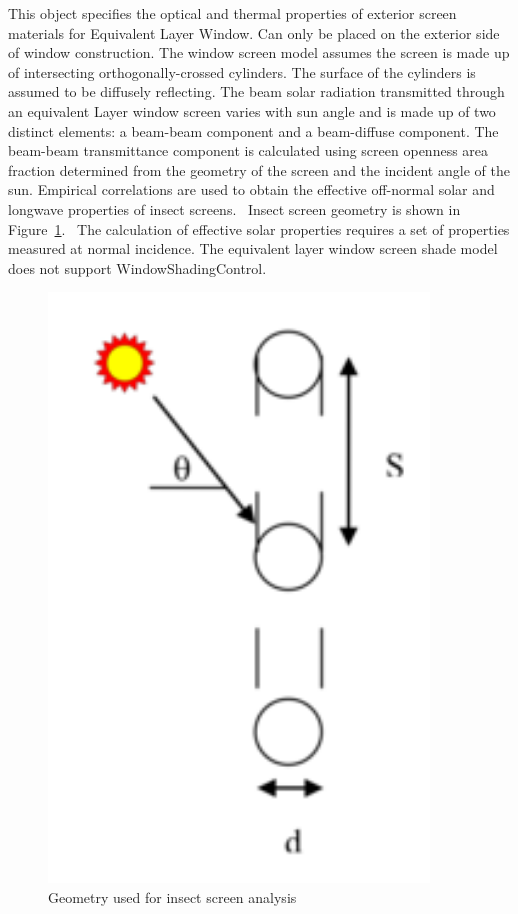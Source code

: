 This object specifies the optical and thermal properties of exterior screen materials for Equivalent Layer Window. Can only be placed on the exterior side of window construction. The window screen model assumes the screen is made up of intersecting orthogonally-crossed cylinders. The surface of the cylinders is assumed to be diffusely reflecting. The beam solar radiation transmitted through an equivalent Layer window screen varies with sun angle and is made up of two distinct elements: a beam-beam component and a beam-diffuse component. The beam-beam transmittance component is calculated using screen openness area fraction determined from the geometry of the screen and the incident angle of the sun. Empirical correlations are used to obtain the effective off-normal solar and longwave properties of insect screens.~ Insect screen geometry is shown in Figure~\ref{fig:geometry-used-for-insect-screen-analysis}.~ The calculation of effective solar properties requires a set of properties measured at normal incidence. The equivalent layer window screen shade model does not support WindowShadingControl.

\begin{figure}[hbtp] %
\centering
\includegraphics[width=0.9\textwidth, height=0.9\textheight, keepaspectratio=true]{media/image048.png}
\caption{Geometry used for insect screen analysis \protect \label{fig:geometry-used-for-insect-screen-analysis}}
\end{figure}

